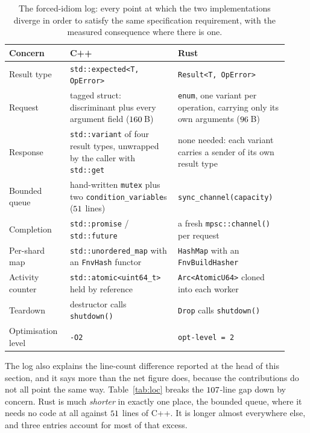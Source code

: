 \documentclass[english,oneside,a4paper,censored,csm,software-track-2020]{HYthesisML}
\begin{document}
\begin{table}[H]
\centering
\small
\caption[The forced-idiom log]{The forced-idiom log: every point at which the two implementations diverge in order
to satisfy the same specification requirement, with the measured consequence where there is
one.\label{tab:idioms}}
\begin{tabular}{@{}R{0.20\linewidth} R{0.36\linewidth} R{0.36\linewidth}@{}}
\hline\hline
Concern & C++ & Rust \\
\hline
Result type & \texttt{std::expected<T, OpError>} & \texttt{Result<T, OpError>} \\
Request & tagged struct: discriminant plus every argument field ($160$\,B) & \texttt{enum}, one variant per operation, carrying only its own arguments ($96$\,B) \\
Response & \texttt{std::variant} of four result types, unwrapped by the caller with \texttt{std::get} & none needed: each variant carries a sender of its own result type \\
Bounded queue & hand-written \texttt{mutex} plus two \texttt{condition\_variable}s ($51$ lines) & \texttt{sync\_channel(capacity)} \\
Completion & \texttt{std::promise} / \texttt{std::future} & a fresh \texttt{mpsc::channel()} per request \\
Per-shard map & \texttt{std::unordered\_map} with an \texttt{FnvHash} functor & \texttt{HashMap} with an \texttt{FnvBuildHasher} \\
Activity counter & \texttt{std::atomic<uint64\_t>} held by reference & \texttt{Arc<AtomicU64>} cloned into each worker \\
Teardown & destructor calls \texttt{shutdown()} & \texttt{Drop} calls \texttt{shutdown()} \\
Optimisation level & \texttt{-O2} & \texttt{opt-level = 2} \\
\hline
\end{tabular}
\end{table}

The log also explains the line-count difference reported at the head of this section, and it
says more than the net figure does, because the contributions do not all point
the same way. Table~\ref{tab:loc} breaks the $107$-line gap down by concern. Rust is
much \emph{shorter} in exactly one place, the bounded queue, where it needs no code
at all against $51$ lines of C++. It is longer almost everywhere else, and
three entries account for most of that excess.
\end{document}
